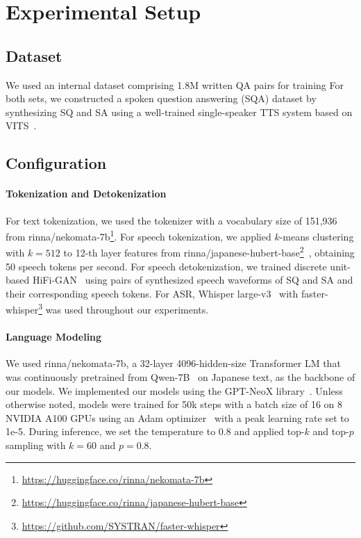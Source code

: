\section{Experimental Setup}
\subsection{Dataset}
We used an internal dataset comprising 1.8M written QA pairs for training 
For both  sets, we constructed a spoken question answering (SQA) dataset by synthesizing SQ and SA using a well-trained single-speaker TTS system based on VITS~\citep{kim2021vits}.

\subsection{Configuration}
\label{sec:config}
\paragraph{Tokenization and Detokenization}
For text tokenization, we used the tokenizer with a vocabulary size of 151,936 from rinna/nekomata-7b\footnote{\url{https://huggingface.co/rinna/nekomata-7b}}.
For speech tokenization, we applied $k$-means clustering with $k=512$ to 12-th layer features from rinna/japanese-hubert-base\footnote{\url{https://huggingface.co/rinna/japanese-hubert-base}}~\citep{sawada2024release}, obtaining 50 speech tokens per second.
For speech detokenization, we trained discrete unit-based HiFi-GAN~\citep{polyak2021speech} using pairs of synthesized speech waveforms of SQ and SA and their corresponding speech tokens.
For ASR, Whisper large-v3~\citep{radford2023robust} with faster-whisper\footnote{\url{https://github.com/SYSTRAN/faster-whisper}} was used throughout our experiments.

\paragraph{Language Modeling}
We used rinna/nekomata-7b, a 32-layer 4096-hidden-size Transformer LM that was continuously pretrained from Qwen-7B~\citep{bai2023qwen} on Japanese text, as the backbone of our models.
We implemented our models using the GPT-NeoX library~\citep{gpt-neox-library}.
Unless otherwise noted, models were trained for 50k steps with a batch size of 16 on 8 NVIDIA A100 GPUs using an Adam optimizer~\citep{kingma2015adam} with a peak learning rate set to 1e-5.
During inference, we set the temperature to 0.8 and applied top-$k$ and top-$p$ sampling with $k=60$ and $p=0.8$.

